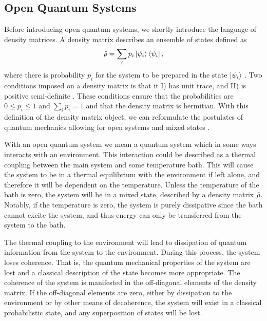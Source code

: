\subsection{Open Quantum Systems} \label{sec:open}
Before introducing open quantum systems, we shortly introduce the language of density matrices. A density matrix describes an ensemble of states defined as 
\begin{equation}
    \hat{\rho} = \sum_i p_i \ket{\psi_i} \bra{\psi_i},
\end{equation}
where there is probability $p_i$ for the system to be prepared in the state $\ket{\psi_i}$ \cite{Nielsen:2010}. Two conditions imposed on a density matrix is that it I) has unit trace, and II) is positive semi-definite \cite{Nielsen:2010}. These conditions ensure that the probabilities are $0 \leq p_i \leq 1$ and $\sum_i p_i = 1$ and that the density matrix is hermitian. With this definition of the density matrix object, we can reformulate the postulates of quantum mechanics allowing for open systems and mixed states \cite{Nielsen:2010}.

With an open quantum system we mean a quantum system which in some ways interacts with an environment. This interaction could be described as a thermal coupling between the main system and some temperature bath. This will cause the system to be in a thermal equilibrium with the environment if left alone, and therefore it will be dependent on the temperature. Unless the temperature of the bath is zero, the system will be in a mixed state, described by a density matrix $\hat{\rho}$. Notably, if the temperature is zero, the system is purely dissipative since the bath cannot excite the system, and thus energy can only be transferred from the system to the bath. \cite{Annby-Andersson:2024}

The thermal coupling to the environment will lead to dissipation of quantum information from the system to the environment. During this process, the system loses coherence. That is, the quantum mechanical properties of the system are lost and a classical description of the state becomes more appropriate. The coherence of the system is manifested in the off-diagonal elements of the density matrix. If the off-diagonal elements are zero, either by dissipation to the environment or by other means of decoherence, the system will exist in a classical probabilistic state, and any superposition of states will be lost. \cite{Annby-Andersson:2024}

